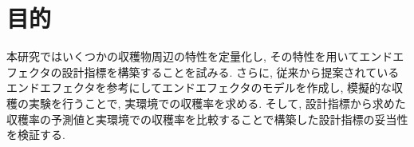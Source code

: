 \section{目的}
本研究ではいくつかの収穫物周辺の特性を定量化し, その特性を用いてエンドエフェクタの設計指標を構築することを試みる.
さらに, 従来から提案されているエンドエフェクタを参考にしてエンドエフェクタのモデルを作成し, 模擬的な収穫の実験を行うことで, 実環境での収穫率を求める.
そして, 設計指標から求めた収穫率の予測値と実環境での収穫率を比較することで構築した設計指標の妥当性を検証する.
